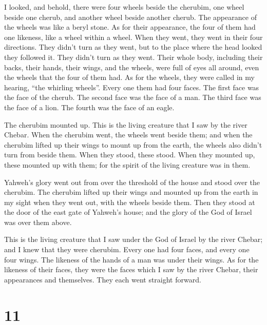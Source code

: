  I looked, and behold, there were four wheels beside the
cherubim, one wheel beside one cherub, and another wheel beside another
cherub. The appearance of the wheels was like a beryl stone.
 As for their appearance, the four of them had one
likeness, like a wheel within a wheel.  When they went,
they went in their four directions. They didn't turn as they went, but
to the place where the head looked they followed it. They didn't turn as
they went.  Their whole body, including their backs,
their hands, their wings, and the wheels, were full of eyes all around,
even the wheels that the four of them had.  As for the
wheels, they were called in my hearing, ``the whirling wheels''.
 Every one them had four faces. The first face was the
face of the cherub. The second face was the face of a man. The third
face was the face of a lion. The fourth was the face of an eagle.

 The cherubim mounted up. This is the living creature
that I saw by the river Chebar.  When the cherubim went,
the wheels went beside them; and when the cherubim lifted up their wings
to mount up from the earth, the wheels also didn't turn from beside
them.  When they stood, these stood. When they mounted
up, these mounted up with them; for the spirit of the living creature
was in them.

 Yahweh's glory went out from over the threshold of the
house and stood over the cherubim.  The cherubim lifted
up their wings and mounted up from the earth in my sight when they went
out, with the wheels beside them. Then they stood at the door of the
east gate of Yahweh's house; and the glory of the God of Israel was over
them above.

 This is the living creature that I saw under the God of
Israel by the river Chebar; and I knew that they were cherubim.
 Every one had four faces, and every one four wings. The
likeness of the hands of a man was under their wings.  As
for the likeness of their faces, they were the faces which I saw by the
river Chebar, their appearances and themselves. They each went straight
forward.

\hypertarget{section-10}{%
\section{11}\label{section-10}}

